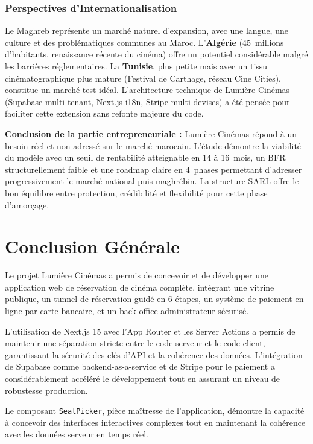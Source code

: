 \documentclass[12pt,a4paper,openany]{report}
\begin{document}
\subsection{Perspectives d'Internationalisation}

Le Maghreb représente un marché naturel d'expansion, avec une langue, une culture et des problématiques communes au Maroc. L'\textbf{Algérie} (45~millions d'habitants, renaissance récente du cinéma) offre un potentiel considérable malgré les barrières réglementaires. La \textbf{Tunisie}, plus petite mais avec un tissu cinématographique plus mature (Festival de Carthage, réseau Cine Cities), constitue un marché test idéal. L'architecture technique de Lumière Cinémas (Supabase multi-tenant, Next.js i18n, Stripe multi-devises) a été pensée pour faciliter cette extension sans refonte majeure du code.

\bigskip
\noindent\textbf{Conclusion de la partie entrepreneuriale :} Lumière Cinémas répond à un besoin réel et non adressé sur le marché marocain. L'étude démontre la viabilité du modèle avec un seuil de rentabilité atteignable en 14 à 16~mois, un BFR structurellement faible et une roadmap claire en 4~phases permettant d'adresser progressivement le marché national puis maghrébin. La structure SARL offre le bon équilibre entre protection, crédibilité et flexibilité pour cette phase d'amorçage.

\chapter*{Conclusion Générale}

Le projet Lumière Cinémas a permis de concevoir et de développer une application web de réservation de cinéma complète, intégrant une vitrine publique, un tunnel de réservation guidé en 6 étapes, un système de paiement en ligne par carte bancaire, et un back-office administrateur sécurisé.

L'utilisation de Next.js 15 avec l'App Router et les Server Actions a permis de maintenir une séparation stricte entre le code serveur et le code client, garantissant la sécurité des clés d'API et la cohérence des données. L'intégration de Supabase comme backend-as-a-service et de Stripe pour le paiement a considérablement accéléré le développement tout en assurant un niveau de robustesse production.

Le composant \texttt{SeatPicker}, pièce maîtresse de l'application, démontre la capacité à concevoir des interfaces interactives complexes tout en maintenant la cohérence avec les données serveur en temps réel.
\end{document}
